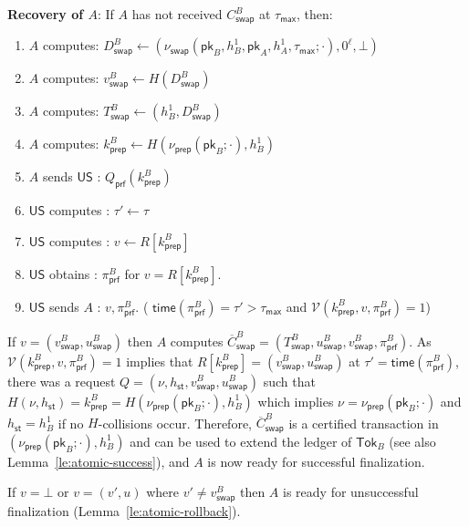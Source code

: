 \documentclass{article}
\newcommand{\pubkey}[0]{\mathsf{pk}}
\newcommand{\unisrv}[0]{\mathsf{US}}
\newcommand{\sthash}[0]{h_\mathsf{st}}
\newcommand{\univer}[0]{\mathcal{V}}
\begin{document}
\noindent\textbf{Recovery of $A$}:  If $A$ has not received $C^B_\mathsf{swap}$ at $\tau_\mathsf{max}$, then:
\begin{enumerate}
    \item $A$ computes: $D^B_\mathsf{swap}\gets (\nu_\mathsf{swap}(\pubkey_B,h^1_B,\pubkey_A,h^1_A,\tau_\mathsf{max};\cdot), 0^\ell,\bot)$
    \item $A$ computes: $v^B_\mathsf{swap}\gets H(D^B_\mathsf{swap})$
    \item $A$ computes: $T^B_\mathsf{swap}\gets (h^1_B, D^B_\mathsf{swap})$
    \item $A$ computes: $k^B_\mathsf{prep}\gets H(\nu_\mathsf{prep}(\pubkey_B;\cdot),h^1_B)$
    \item $A$ sends $\unisrv$ : $Q_\mathsf{prf}(k^B_\mathsf{prep})$
    \item $\unisrv$ computes : $\tau'\gets \tau$
    \item $\unisrv$ computes : $v\gets R[k^B_\mathsf{prep}]$
    \item $\unisrv$ obtains : $\pi^B_\mathsf{prf}$ for $v=R[k^B_\mathsf{prep}]$.
    \item $\unisrv$ sends $A$ : $v,\pi^B_\mathsf{prf}$. (
    $\mathsf{time}(\pi^B_\mathsf{prf})=\tau'>\tau_\mathsf{max}$ and $\univer(k^B_\mathsf{prep},v,\pi^B_\mathsf{prf})=1$)
\end{enumerate}
If $v=(v^B_\mathsf{swap},u^B_\mathsf{swap})$ then $A$ computes
$\overline{C}^B_\mathsf{swap}=(T^B_\mathsf{swap},u^B_\mathsf{swap},v^B_\mathsf{swap},\pi^B_\mathsf{prf})$.
As $\univer(k^B_\mathsf{prep},v,\pi^B_\mathsf{prf})=1$ implies that
$R[k^B_\mathsf{prep}]=(v^B_\mathsf{swap},u^B_\mathsf{swap})$ at $\tau'=\mathsf{time}(\pi^B_\mathsf{prf})$, there was a request $Q=(\nu,\sthash,v^B_\mathsf{swap},u^B_\mathsf{swap})$ such that $H(\nu,\sthash)=k^B_\mathsf{prep}=H(\nu_\mathsf{prep}(\pubkey_B;\cdot),h^1_B)$
which implies $\nu=\nu_\mathsf{prep}(\pubkey_B;\cdot)$ and $\sthash=h^1_B$ if no $H$-collisions occur. Therefore, $\overline{C}^B_\mathsf{swap}$ is a certified transaction in $(\nu_\mathsf{prep}(\pubkey_B;\cdot),h^1_B)$ and can be used to extend the ledger of $\mathsf{Tok}_B$ (see also Lemma~\ref{le:atomic-success}),
and $A$ is now ready for successful finalization.\medskip

\noindent If $v=\bot$ or  $v=(v',u)$  where $v'\neq v^B_\mathsf{swap}$ then
$A$ is ready for unsuccessful finalization (Lemma~\ref{le:atomic-rollback}).
\medskip
\end{document}
